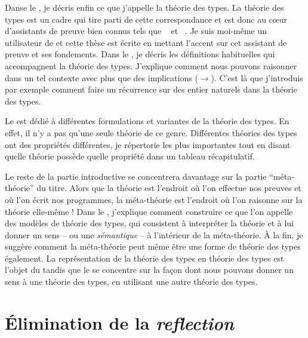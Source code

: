 Danse le , je décris enfin ce que j'appelle la théorie
des types.
La théorie des types est un cadre qui tire parti de cette correspondance et est donc au cœur d'assistants de preuve bien connus tels que
\Coq~ et \Agda~.
Je suis moi-même un utilisateur de \Coq et cette thèse est écrite en mettant
l'accent sur cet assistant de preuve et ses fondements.
Dans le , je décris les définitions habituelles qui
accompagnent la théorie des types.
J'explique comment nous pouvons raisonner dans un tel contexte avec plus que des
implications (\(\to\)).
%
C'est là que j'introduis par exemple comment faire un récurrence sur des entier
naturels dans la théorie des types.

Le  est dédié à différentes formulations et variantes de la
théorie des types. En effet, il n'y a pas qu'une seule théorie de ce genre.
Différentes théories des types ont des propriétés différentes, je répertorie les
plus importantes tout en disant quelle théorie possède quelle propriété dans un
tableau récapitulatif.

Le reste de la partie introductive se concentrera davantage sur la partie
``méta-théorie'' du titre. Alors que la théorie est l'endroit où l'on effectue
nos preuves et où l'on écrit nos programmes, la méta-théorie est l'endroit où
l'on raisonne sur la théorie elle-même !
Dans le , j'explique comment construire ce que l'on appelle des
modèles de théorie des types, qui consistent à interpréter la théorie et à lui
donner un sens -- ou une \emph{sémantique} -- à l'intérieur de la
méta-théorie. À la fin, je suggère comment la méta-théorie peut même être une
forme de théorie des types également. La représentation de la théorie des types
en théorie des types est l'objet du  tandis que le
 se concentre sur la façon dont nous pouvons donner un sens
à une théorie des types, en utilisant une autre théorie des types.

\section{Élimination de la \emph{reflection}}

